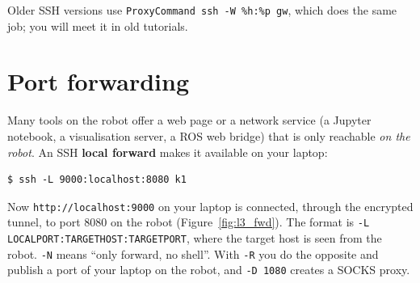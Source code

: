 Older SSH versions use \verb|ProxyCommand ssh -W %h:%p gw|, which does the same job; you will meet it in old tutorials.

\section*{Port forwarding}
Many tools on the robot offer a web page or a network service (a Jupyter notebook, a visualisation server, a ROS web bridge) that is only reachable \emph{on the robot}. An SSH \textbf{local forward} makes it available on your laptop:
\begin{verbatim}
$ ssh -L 9000:localhost:8080 k1
\end{verbatim}
Now \texttt{http://localhost:9000} on your laptop is connected, through the encrypted tunnel, to port $8080$ on the robot (Figure~\ref{fig:l3_fwd}). The format is \verb|-L LOCALPORT:TARGETHOST:TARGETPORT|, where the target host is seen from the robot. \verb|-N| means ``only forward, no shell''. With \verb|-R| you do the opposite and publish a port of your laptop on the robot, and \verb|-D 1080| creates a SOCKS proxy.

\begin{center}
\label{fig:l3_fwd}
\end{center}

